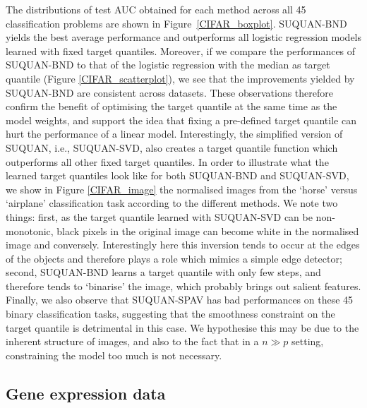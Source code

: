 \documentclass{article}
\begin{document}
The distributions of test AUC obtained for each method across all 45 classification problems are shown in Figure~\ref{CIFAR_boxplot}. SUQUAN-BND yields the best average performance and outperforms all logistic regression models learned with fixed target quantiles. Moreover, if we compare the performances of SUQUAN-BND to that of the logistic regression with the median as target quantile (Figure \ref{CIFAR_scatterplot}), we see that the improvements yielded by SUQUAN-BND are consistent across datasets. These observations therefore confirm the benefit  of optimising the target quantile at the same time as the model weights, and support the idea that fixing a pre-defined target quantile can hurt the performance of a linear model. Interestingly, the simplified version of SUQUAN, i.e., SUQUAN-SVD, also creates a target quantile function which outperforms all other fixed target quantiles. In order to illustrate what the learned target quantiles look like for both SUQUAN-BND and SUQUAN-SVD, we show in Figure \ref{CIFAR_image} the normalised images from the `horse' versus `airplane' classification task according to the different methods. We note two things: first, as the target quantile learned with SUQUAN-SVD can be non-monotonic, black pixels in the original image can become white in the normalised image and conversely. Interestingly here this inversion tends to occur at the edges of the objects and therefore plays a role which mimics a simple edge detector; second, SUQUAN-BND learns a target quantile with only few steps, and therefore tends to `binarise' the image, which probably brings out salient features. Finally, we also observe that SUQUAN-SPAV has bad performances on these 45 binary classification tasks, suggesting that the smoothness constraint on the target quantile is detrimental in this case. We hypothesise this may be due to the inherent structure of images, and also to the fact that in a $n \gg p$ setting, constraining the model too much is not necessary.

\subsection{Gene expression data}
\end{document}
